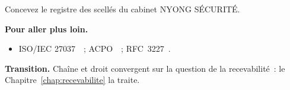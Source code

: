 \begin{boxexo}[title={\ding{45}\quad Exercice~5.10. Registre \niveauexpert}]
Concevez le registre des scellés du cabinet NYONG SÉCURITÉ.
\end{boxexo}

\bigskip

\begin{boxinfo}
\textbf{Pour aller plus loin.}
\begin{itemize}
    \item ISO/IEC 27037~\cite{iso27037}~; ACPO~\cite{acpo2012}~;
          RFC~3227~\cite{rfc3227}.
\end{itemize}
\end{boxinfo}

\begin{boxinfo}
\textbf{Transition.} Chaîne et droit convergent sur la question de la
recevabilité~: le Chapitre~\ref{chap:recevabilite} la traite.
\end{boxinfo}
